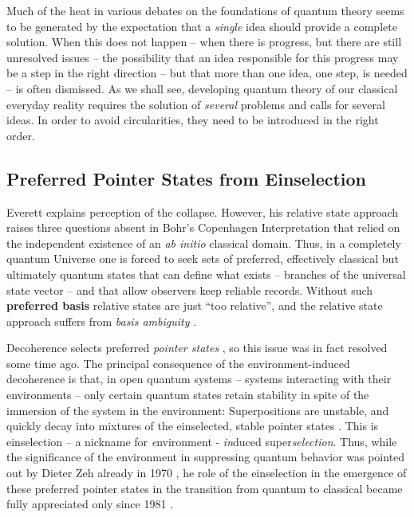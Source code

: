 \documentclass[aps,amsmath,amssymb,amsfonts,12pt]{revtex4-1}
\newcommand{\+}         {\dagger}
\begin{document}
Much of the heat in various debates on the foundations of quantum theory seems to be generated by the expectation that a {\it single} idea should provide a complete solution.
When this does not happen -- when there is progress, but there are still unresolved issues -- the possibility that an idea
responsible for this progress may be a step in the right direction -- but that more than one idea, one step, is needed -- is often dismissed.
As we shall see, developing quantum theory of our classical everyday reality requires the solution of {\it several} problems and calls
for several ideas. In order to avoid circularities, they need to be introduced in the right order. 

\subsection{Preferred Pointer States from Einselection}

Everett explains perception of the collapse. However, his relative state approach raises three questions
absent in Bohr's Copenhagen Interpretation \cite{11} that relied on the independent existence
of an {\it ab initio} classical domain. 
Thus, in a completely quantum Universe one is forced to seek
sets of preferred, effectively classical but ultimately quantum states that can define what exists -- branches of the universal
state vector -- and that allow observers keep reliable records. Without such
{\bf preferred basis} relative states are just ``too relative'', and the relative state approach suffers from {\it basis ambiguity} \cite{69}.

Decoherence selects preferred {\it pointer states} \cite{69,70, 71}, so this issue was in fact resolved some time ago.  The principal consequence of the environment-induced decoherence is that, in open quantum systems -- systems interacting with their environments -- only certain quantum states retain stability in spite of the immersion of the system in the environment: Superpositions are unstable, and quickly decay into mixtures of the einselected, stable pointer states \cite{ZurekNatPhys, ZurekPT, Z07a, Zurekbook, 69, Zeh, 70, 71, 45, 36, 72, 73, 75, 51,52}. This is einselection -- a nickname for {\it e}nvironment - {\it in}duced super{\it selection}. Thus, while the significance of the environment in suppressing quantum behavior was pointed out by Dieter Zeh already in 1970 \cite{67}, he role of the einselection in the emergence of these preferred pointer states in the transition from quantum to classical became fully appreciated only since 1981 \cite{ZehDark}.
\end{document}
